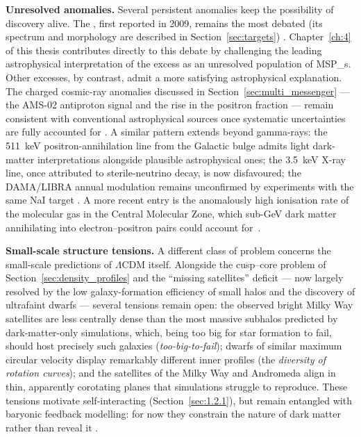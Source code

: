 \textbf{Unresolved anomalies.}
Several persistent anomalies keep the possibility of discovery alive.
The \GCE, first reported in 2009, remains the most debated (its spectrum and morphology are described in Section~\ref{sec:targets}) \cite{Daylan:2014rsa,Cirelli:2024ssz}.
Chapter~\ref{ch:4} of this thesis contributes directly to this debate by challenging the leading astrophysical interpretation of the excess as an unresolved population of \glspl{MSP_}.
Other excesses, by contrast, admit a more satisfying astrophysical explanation.
The charged cosmic-ray anomalies discussed in Section~\ref{sec:multi_messenger} --- the AMS-02 antiproton signal and the rise in the positron fraction --- remain consistent with conventional astrophysical sources once systematic uncertainties are fully accounted for \cite{Hooper:2024}.
A similar pattern extends beyond gamma-rays: the 511~keV positron-annihilation line from the Galactic bulge admits light dark-matter interpretations alongside plausible astrophysical ones; the 3.5~keV X-ray line, once attributed to sterile-neutrino decay, is now disfavoured; the DAMA/LIBRA annual modulation remains unconfirmed by experiments with the same NaI target \cite{Cirelli:2024ssz}. A more recent entry is the anomalously high ionisation rate of the molecular gas in the Central Molecular Zone, which sub-GeV dark matter annihilating into electron--positron pairs could account for~\cite{DelaTorreLuque:2024fcc}.

\textbf{Small-scale structure tensions.}
A different class of problem concerns the small-scale predictions of $\Lambda$CDM itself.
Alongside the cusp--core problem of Section~\ref{sec:density_profiles} and the ``missing satellites'' deficit --- now largely resolved by the low galaxy-formation efficiency of small halos and the discovery of ultrafaint dwarfs --- several tensions remain open:
the observed bright Milky Way satellites are less centrally dense than the most massive subhalos predicted by dark-matter-only simulations, which, being too big for star formation to fail, should host precisely such galaxies (\textit{too-big-to-fail});
%
%
%
dwarfs of similar maximum circular velocity display remarkably different inner profiles (the \textit{diversity of rotation curves}); and the satellites of the Milky Way and Andromeda align in thin, apparently corotating planes that simulations struggle to reproduce.
These tensions motivate self-interacting (Section~\ref{sec:1.2.1}), but remain entangled with baryonic feedback modelling: for now they constrain the nature of dark matter rather than reveal it \cite{Bullock:2017xww, Tulin:2017ara}.

